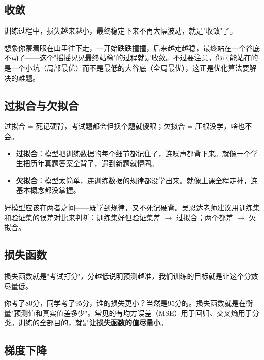 \documentclass[12pt,a4paper]{ctexart}
\begin{document}
\subsection{收敛}

\begin{funbox}[一句话解释]
训练过程中，损失越来越小，最终稳定下来不再大幅波动，就是"收敛"了。
\end{funbox}

想象你蒙着眼在山里往下走，一开始跌跌撞撞，后来越走越稳，最终站在一个谷底不动了——这个"摇摇晃晃最终站稳"的过程就是收敛。不过要注意，你可能站在的是一个小坑（局部最优）而不是最低的大谷底（全局最优），这正是优化算法要解决的难题。

\subsection{过拟合与欠拟合}

\begin{funbox}[一句话解释]
过拟合 = 死记硬背，考试题都会但换个题就傻眼；欠拟合 = 压根没学，啥也不会。
\end{funbox}

\begin{itemize}[leftmargin=2em]
  \item \textbf{过拟合}：模型把训练数据的每个细节都记住了，连噪声都背下来。就像一个学生把历年真题答案全背了，遇到新题就懵圈。
  \item \textbf{欠拟合}：模型太简单，连训练数据的规律都没学出来。就像上课全程走神，连基本概念都没掌握。
\end{itemize}

好模型应该在两者之间——既学到规律，又不死记硬背。吴恩达老师建议用训练集和验证集的误差对比来判断：训练集好但验证集差 $\to$ 过拟合；两个都差 $\to$ 欠拟合。

\subsection{损失函数}

\begin{funbox}[一句话解释]
损失函数就是"考试打分"，分越低说明预测越准，我们训练的目标就是让这个分数尽量低。
\end{funbox}

你考了80分，同学考了95分，谁的损失更小？当然是95分的。损失函数就是在衡量"预测值和真实值差多少"。常见的有均方误差（MSE）用于回归、交叉熵用于分类。训练的全部目的，就是\textbf{让损失函数的值尽量小}。

\subsection{梯度下降}
\end{document}
